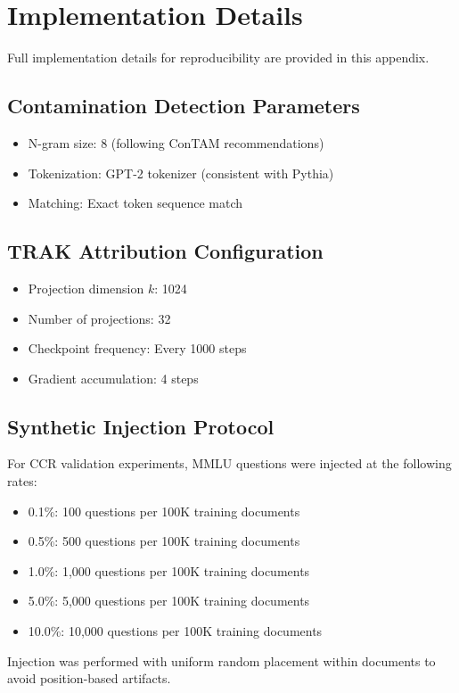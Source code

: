 
\section{Implementation Details}
\label{app:implementation}

Full implementation details for reproducibility are provided in this appendix.

\subsection{Contamination Detection Parameters}

\begin{itemize}
    \item N-gram size: 8 (following ConTAM recommendations)
    \item Tokenization: GPT-2 tokenizer (consistent with Pythia)
    \item Matching: Exact token sequence match
\end{itemize}

\subsection{TRAK Attribution Configuration}

\begin{itemize}
    \item Projection dimension $k$: 1024
    \item Number of projections: 32
    \item Checkpoint frequency: Every 1000 steps
    \item Gradient accumulation: 4 steps
\end{itemize}

\subsection{Synthetic Injection Protocol}

For CCR validation experiments, MMLU questions were injected at the following rates:
\begin{itemize}
    \item 0.1\%: 100 questions per 100K training documents
    \item 0.5\%: 500 questions per 100K training documents
    \item 1.0\%: 1,000 questions per 100K training documents
    \item 5.0\%: 5,000 questions per 100K training documents
    \item 10.0\%: 10,000 questions per 100K training documents
\end{itemize}

Injection was performed with uniform random placement within documents to avoid position-based artifacts.

